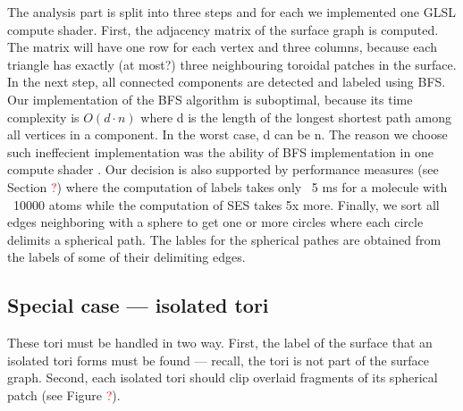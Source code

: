 The analysis part is split into three steps and for each we implemented one GLSL compute shader.
First, the adjacency matrix of the surface graph is computed.
The matrix will have one row for each vertex and three columns, because each triangle has exactly (at most?) three neighbouring toroidal patches in the surface. In the next step, all connected components are detected and labeled using BFS.
Our implementation of the BFS algorithm is suboptimal, because its time complexity is $O(d \cdot n)$ where d is the length of the longest shortest path among all vertices in a component.
In the worst case, d can be n.
The reason we choose such ineffecient implementation was the ability of BFS implementation in one compute shader \cite{merrill2012scalable}.
Our decision is also supported by performance measures (see Section \textcolor{red}{?}) where the computation of labels takes only ~5 ms for a molecule with ~10000 atoms while the computation of SES takes 5x more.
Finally, we sort all edges neighboring with a sphere to get one or more circles where each circle delimits a spherical path.
The lables for the spherical pathes are obtained from the labels of some of their delimiting edges.

\subsection{Special case --- isolated tori}
These tori must be handled in two way.
First, the label of the surface that an isolated tori forms must be found --- recall, the tori is not part of the surface graph.
Second, each isolated tori should clip overlaid fragments of its spherical patch (see Figure \textcolor{red}{?}).


